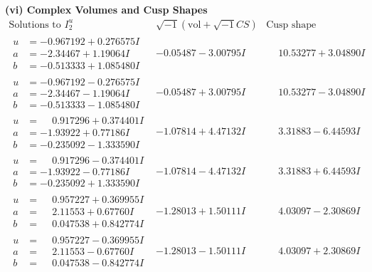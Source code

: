 \documentclass[1p]{elsarticle_modified}
\theoremstyle{definition}
\newcommand{\I}{\sqrt{-1}}
\begin{document}
\newpage\flushleft \textbf{(vi) Complex Volumes and Cusp Shapes}
$$\begin{array}{c|c|c}  
\text{Solutions to }I^u_{2}& \I (\text{vol} + \sqrt{-1}CS) & \text{Cusp shape}\\
 \hline 
\begin{aligned}
u &= -0.967192 + 0.276575 I \\
a &= -2.34467 + 1.19064 I \\
b &= -0.513333 + 1.085480 I\end{aligned}
 & -0.05487 - 3.00795 I & \phantom{-}10.53277 + 3.04890 I \\ \hline\begin{aligned}
u &= -0.967192 - 0.276575 I \\
a &= -2.34467 - 1.19064 I \\
b &= -0.513333 - 1.085480 I\end{aligned}
 & -0.05487 + 3.00795 I & \phantom{-}10.53277 - 3.04890 I \\ \hline\begin{aligned}
u &= \phantom{-}0.917296 + 0.374401 I \\
a &= -1.93922 + 0.77186 I \\
b &= -0.235092 - 1.333590 I\end{aligned}
 & -1.07814 + 4.47132 I & \phantom{-}3.31883 - 6.44593 I \\ \hline\begin{aligned}
u &= \phantom{-}0.917296 - 0.374401 I \\
a &= -1.93922 - 0.77186 I \\
b &= -0.235092 + 1.333590 I\end{aligned}
 & -1.07814 - 4.47132 I & \phantom{-}3.31883 + 6.44593 I \\ \hline\begin{aligned}
u &= \phantom{-}0.957227 + 0.369955 I \\
a &= \phantom{-}2.11553 + 0.67760 I \\
b &= \phantom{-}0.047538 + 0.842774 I\end{aligned}
 & -1.28013 + 1.50111 I & \phantom{-}4.03097 - 2.30869 I \\ \hline\begin{aligned}
u &= \phantom{-}0.957227 - 0.369955 I \\
a &= \phantom{-}2.11553 - 0.67760 I \\
b &= \phantom{-}0.047538 - 0.842774 I\end{aligned}
 & -1.28013 - 1.50111 I & \phantom{-}4.03097 + 2.30869 I \\ \hline\begin{aligned}

\end{aligned}
\end{array}$$
\end{document}
